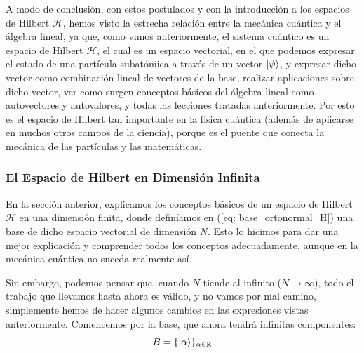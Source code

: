 \documentclass{article}
\numberwithin{equation}{section} %
\begin{document}
    \vspace{5mm}

    A modo de conclusión, con estos postulados y con la introducción a los espacios de Hilbert \( \mathcal{H} \), hemos visto la estrecha relación entre la mecánica cuántica y el álgebra lineal, ya que, como vimos anteriormente, el sistema cuántico es un espacio de Hilbert \( \mathcal{H} \), el cual es un espacio vectorial, en el que podemos expresar el estado de una partícula subatómica a través de un vector \( \ket{\psi} \), y expresar dicho vector como combinación lineal de vectores de la base, realizar aplicaciones sobre dicho vector, ver como surgen conceptos básicos del álgebra lineal como autovectores y autovalores, y todas las lecciones tratadas anteriormente. Por esto es el espacio de Hilbert tan importante en la física cuántica (además de aplicarse en muchos otros campos de la ciencia), porque es el puente que conecta la mecánica de las partículas y las matemáticas.

    \vspace{10mm}





    \subsubsection{El Espacio de Hilbert en Dimensión Infinita}

    \vspace{5mm}

    En la sección anterior, explicamos los conceptos básicos de un espacio de Hilbert \( \mathcal{H} \) en una dimensión finita, donde definíamos en (\ref{eq: base_ortonormal_H}) una base de dicho espacio vectorial de dimensión \( N \). Esto lo hicimos para dar una mejor explicación y comprender todos los conceptos adecuadamente, aunque en la mecánica cuántica no suceda realmente así. 

    \vspace{5mm}

    Sin embargo, podemos pensar que, cuando \( N \) tiende al infinito (\( N \rightarrow \infty \)), todo el trabajo que llevamos hasta ahora es válido, y no vamos por mal camino, simplemente hemos de hacer algunos cambios en las expresiones vistas anteriormente. Comencemos por la base, que ahora tendrá infinitas componentes:
    \begin{equation}
        B = \{ \ket{\alpha} \} _{\alpha \in \mathbb{R}}
        \label{eq: base_ortonormal_L2}
    \end{equation} 
\end{document}
